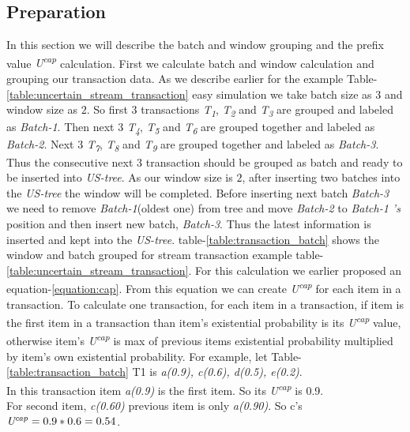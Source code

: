     \subsection{Preparation}
    
    In this section we will describe the batch and window grouping and the prefix value \emph{U\textsuperscript{cap}} calculation. First we calculate batch and window calculation and grouping our transaction data. As we describe earlier for the example Table-\ref{table:uncertain_stream_transaction} easy simulation we take batch size as \emph{$3$} and window size as \emph{$2$}. So first \emph{$3$} transactions \emph{T\textsubscript{1}}, \emph{T\textsubscript{2}} and \emph{T\textsubscript{3}} are grouped and labeled as \emph{Batch-1}. Then next \emph{$3$} \emph{T\textsubscript{4}}, \emph{T\textsubscript{5}} and \emph{T\textsubscript{6}} are grouped together and labeled as \emph{Batch-2}. Next \emph{$3$} \emph{T\textsubscript{7}}, \emph{T\textsubscript{8}} and \emph{T\textsubscript{9}} are grouped together and labeled as \emph{Batch-3}. Thus the consecutive next \emph{$3$} transaction should be grouped as batch and ready to be inserted into \emph{US-tree}. As our window size is $2$, after inserting two batches into the \emph{US-tree} the window will be completed. Before inserting next batch \emph{Batch-3} we need to remove \emph{Batch-1}(oldest one) from tree and move \emph{Batch-2} to \emph{Batch-1 's} position and then insert new batch, \emph{Batch-3}. Thus the latest information is inserted and kept into the \emph{US-tree}. table-\ref{table:transaction_batch} shows the window and batch grouped for stream transaction example table-\ref{table:uncertain_stream_transaction}.
    For this calculation we earlier proposed an equation-\ref{equation:cap}. From this equation we can create \emph{U\textsuperscript{cap}} for each item in a transaction. To calculate one transaction, for each item in a transaction, if item is the first item in a transaction than item's existential probability is its \emph{U\textsuperscript{cap}} value, otherwise item's \emph{U\textsuperscript{cap}} is max of previous items existential probability multiplied by item's  own existential probability. For example, let Table-\ref{table:transaction_batch} T1 is \emph{a(0.9), c(0.6), d(0.5), e(0.2)}. \\
    In this transaction item \emph{a(0.9)} is the first item. So its \emph{U\textsuperscript{cap}} is 0.9.\\
    For second item, \emph{c(0.60)} previous item is only \emph{a(0.90)}. So c's $\emph{U\textsuperscript{cap}} = 0.9*0.6 = 0.54$. \\
